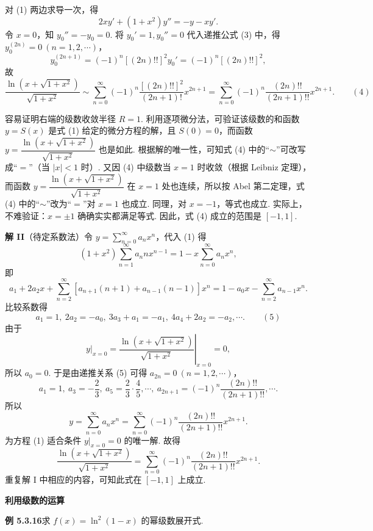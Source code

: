 \documentclass[UTF8,12pt,a4paper,fontset=fandol]{ctexart}
\begin{document}
对 (1) 两边求导一次，得
\[
  2xy'+(1+x^2)y''=-y-xy'.
\]
令 $x=0$，知 $y_0''=-y_0=0$. 将 $y_0'=1,y_0''=0$ 代入递推公式 (3) 中，得
$y_0^{(2n)}=0\ (n=1,2,\cdots)$，
\[
  y_0^{(2n+1)}=(-1)^n[(2n)!!]^2y_0'=(-1)^n[(2n)!!]^2,
\]
故
\[
  \frac{\ln(x+\sqrt{1+x^2})}{\sqrt{1+x^2}}
  \sim\sum_{n=0}^{\infty}(-1)^n\frac{[(2n)!!]^2}{(2n+1)!}x^{2n+1}
  =\sum_{n=0}^{\infty}(-1)^n\frac{(2n)!!}{(2n+1)!!}x^{2n+1}. \qquad(4)
\]

容易证明右端的级数收敛半径 $R=1$. 利用逐项微分法，可验证该级数的和函数 $y=S(x)$ 是式 (1) 给定的微分方程的解，且 $S(0)=0$，而函数
$y=\dfrac{\ln(x+\sqrt{1+x^2})}{\sqrt{1+x^2}}$ 也是如此. 根据解的唯一性，可知式 (4) 中的“$\sim$”可改写成“$=$”（当 $|x|<1$ 时）. 又因 (4) 中级数当 $x=1$ 时收敛（根据 Leibniz 定理），而函数
$y=\dfrac{\ln(x+\sqrt{1+x^2})}{\sqrt{1+x^2}}$ 在 $x=1$ 处也连续，所以按 Abel 第二定理，式 (4) 中的“$\sim$”改为“$=$”对 $x=1$ 也成立. 同理，对 $x=-1$，等式也成立. 实际上，不难验证：$x=\pm1$ 确确实实都满足等式. 因此，式 (4) 成立的范围是 $[-1,1]$.

\noindent\textbf{解 II}\quad （待定系数法）令
$y=\displaystyle\sum_{n=0}^{\infty}a_nx^n$，代入 (1) 得
\[
  (1+x^2)\sum_{n=1}^{\infty}a_nnx^{n-1}
  =1-x\sum_{n=0}^{\infty}a_nx^n,
\]
即
\[
  a_1+2a_2x+\sum_{n=2}^{\infty}[a_{n+1}(n+1)+a_{n-1}(n-1)]x^n
  =1-a_0x-\sum_{n=2}^{\infty}a_{n-1}x^n.
\]
比较系数得
\[
  a_1=1,\ 2a_2=-a_0,\ 3a_3+a_1=-a_1,\ 4a_4+2a_2=-a_2,\cdots. \qquad(5)
\]
由于
\[
  y\big|_{x=0}
  =\left.\frac{\ln(x+\sqrt{1+x^2})}{\sqrt{1+x^2}}\right|_{x=0}=0,
\]
所以 $a_0=0$. 于是由递推关系 (5) 可得 $a_{2n}=0\ (n=1,2,\cdots)$，
\[
  a_1=1,\ a_3=-\frac23,\ a_5=\frac23\cdot\frac45,\cdots,\ 
  a_{2n+1}=(-1)^n\frac{(2n)!!}{(2n+1)!!},\cdots.
\]
所以
\[
  y=\sum_{n=0}^{\infty}a_nx^n
  =\sum_{n=0}^{\infty}(-1)^n\frac{(2n)!!}{(2n+1)!!}x^{2n+1}.
\]
为方程 (1) 适合条件 $y|_{x=0}=0$ 的唯一解. 故得
\[
  \frac{\ln(x+\sqrt{1+x^2})}{\sqrt{1+x^2}}
  =\sum_{n=0}^{\infty}(-1)^n\frac{(2n)!!}{(2n+1)!!}x^{2n+1}.
\]
重复解 I 中相应的内容，可知此式在 $[-1,1]$ 上成立.

\noindent\textbf{利用级数的运算}

\noindent\textbf{例 5.3.16}\quad 求 $f(x)=\ln^2(1-x)$ 的幂级数展开式.
\end{document}
